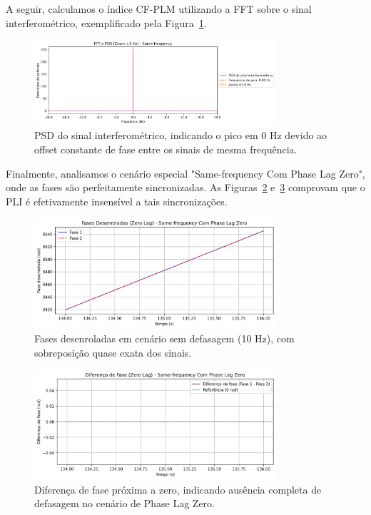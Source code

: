 A seguir, calculamos o índice CF-PLM utilizando a FFT sobre o sinal interferométrico, exemplificado pela Figura~\ref{fig:fft_psd_samefreq}.

\begin{figure}[htb]
    \centering
    \includegraphics[width=0.8\textwidth]{figs/3_2_testing_connectivity_metrics/14_Passo3_FFT_PSD_Same-frequency.png}
    \caption{PSD do sinal interferométrico, indicando o pico em 0 Hz devido ao offset constante de fase entre os sinais de mesma frequência.}
    \label{fig:fft_psd_samefreq}
\end{figure}

Finalmente, analisamos o cenário especial "Same-frequency Com Phase Lag Zero", onde as fases são perfeitamente sincronizadas. As Figuras~\ref{fig:zerolag_phases_final} e~\ref{fig:zerolag_difference_final} comprovam que o PLI é efetivamente insensível a tais sincronizações.

\begin{figure}[htb]
    \centering
    \includegraphics[width=0.8\textwidth]{figs/3_2_testing_connectivity_metrics/15_ZeroLag_Fases_Same-frequency Com Phase Lag Zero.png}
    \caption{Fases desenroladas em cenário sem defasagem (10 Hz), com sobreposição quase exata dos sinais.}
    \label{fig:zerolag_phases_final}
\end{figure}

\begin{figure}[htb]
    \centering
    \includegraphics[width=0.8\textwidth]{figs/3_2_testing_connectivity_metrics/16_ZeroLag_Diferenca_Fase_Same-frequency Com Phase Lag Zero.png}
    \caption{Diferença de fase próxima a zero, indicando ausência completa de defasagem no cenário de Phase Lag Zero.}
    \label{fig:zerolag_difference_final}
\end{figure}

